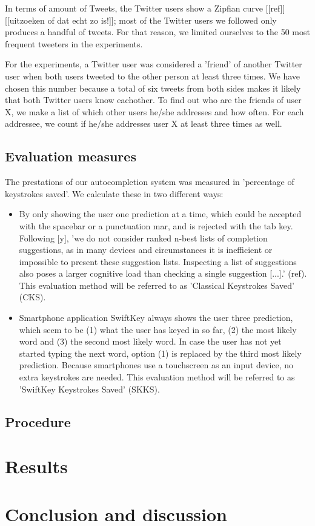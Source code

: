 \documentclass[12pt]{article}
\begin{document}
In terms of amount of Tweets, the Twitter users show a Zipfian curve [[ref]]  [[uitzoeken of dat echt zo is!]]; most of the Twitter users we followed only produces a handful of tweets. For that reason, we limited ourselves to the 50 most frequent tweeters in the experiments.

For the experiments, a Twitter user was considered a 'friend' of another Twitter user when both users tweeted to the other person at least three times. We have chosen this number because a total of six tweets from both sides makes it likely that both Twitter users know eachother. To find out who are the friends of user X, we make a list of which other users he/she addresses and how often. For each addressee, we count if he/she addresses user X at least three times as well.

\subsection{Evaluation measures}
The prestations of our autocompletion system was measured in 'percentage of keystrokes saved'. We calculate these in two different ways:
\begin{itemize}
\item By only showing the user one prediction at a time, which could be accepted with the spacebar or a punctuation mar, and is rejected with the tab key. Following [y], 'we do not consider ranked n-best lists of completion suggestions, as in many devices and circumstances it is inefficient or impossible to present these suggestion lists. Inspecting a list of suggestions also poses a larger cognitive load than checking a single suggestion [...].' (ref). This evaluation method will be referred to as 'Classical Keystrokes Saved' (CKS).
\item Smartphone application SwiftKey always shows the user three prediction, which seem to be (1) what the user has keyed in so far, (2) the most likely word and (3) the second most likely word. In case the user has not yet started typing the next word, option (1) is replaced by the third most likely prediction. Because smartphones use a touchscreen as an input device, no extra keystrokes are needed. This evaluation method will be referred to as 'SwiftKey Keystrokes Saved' (SKKS).
\end{itemize}


\subsection{Procedure}

\section{Results}

\section{Conclusion and discussion}
\end{document}
